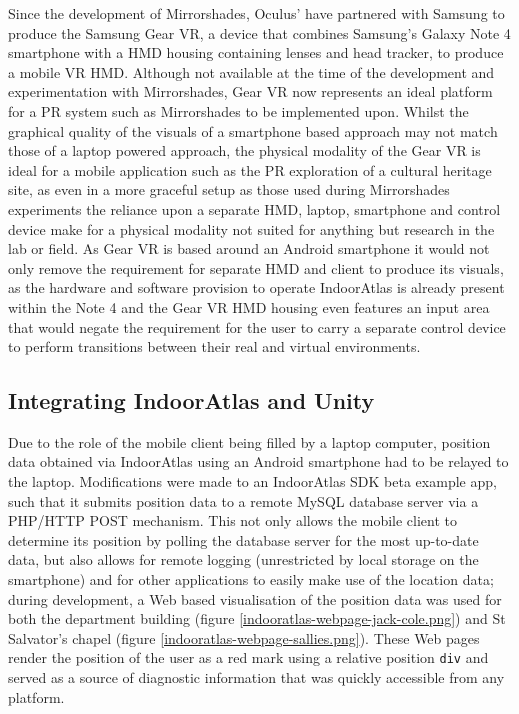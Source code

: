 Since the development of Mirrorshades, Oculus' have partnered with Samsung to produce the Samsung Gear VR, a device that combines Samsung's Galaxy Note 4 smartphone with a HMD housing containing lenses and head tracker, to produce a mobile VR HMD. Although not available at the time of the development and experimentation with Mirrorshades, Gear VR now represents an ideal platform for a PR system such as Mirrorshades to be implemented upon. Whilst the graphical quality of the visuals of a smartphone based approach may not match those of a laptop powered approach, the physical modality of the Gear VR is ideal for a mobile application such as the PR exploration of a cultural heritage site, as even in a more graceful setup as those used during Mirrorshades experiments the reliance upon a separate HMD, laptop, smartphone and control device make for a physical modality not suited for anything but research in the lab or field. As Gear VR is based around an Android smartphone it would not only remove the requirement for separate HMD and client to produce its visuals, as the hardware and software provision to operate IndoorAtlas is already present within the Note 4 and the Gear VR HMD housing even features an input area that would negate the requirement for the user to carry a separate control device to perform transitions between their real and virtual environments.


\subsection{Integrating IndoorAtlas and Unity}

Due to the role of the mobile client being filled by a laptop computer, position data obtained via IndoorAtlas using an Android smartphone had to be relayed to the laptop. Modifications were made to an IndoorAtlas SDK beta example app, such that it submits position data to a remote MySQL database server via a PHP/HTTP POST mechanism. This not only allows the mobile client to determine its position by polling the database server for the most up-to-date data, but also allows for remote logging (unrestricted by local storage on the smartphone) and for other applications to easily make use of the location data; during development, a Web based visualisation of the position data was used for both the department building (figure \ref{indooratlas-webpage-jack-cole.png}) and St Salvator's chapel (figure \ref{indooratlas-webpage-sallies.png}). These Web pages render the position of the user as a red mark using a relative position \texttt{div} and served as a source of diagnostic information that was quickly accessible from any platform.

